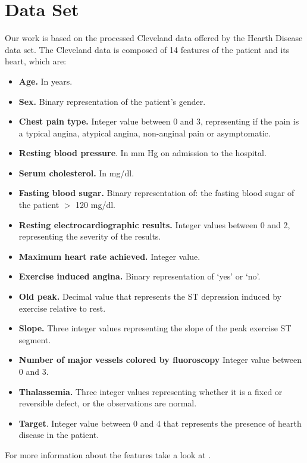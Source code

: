 \section{Data Set}
Our work is based on the processed Cleveland data offered by the Hearth Disease data set. The Cleveland data is composed of 14 features of the patient and its heart, which are:
\begin{itemize}
    \item \textbf{Age.} In years.
    \item \textbf{Sex.} Binary representation of the patient's gender.
    \item \textbf{Chest pain type.} Integer value between 0 and 3, representing if the pain is a typical angina, atypical angina, non-anginal pain or asymptomatic.
    \item \textbf{Resting blood pressure}. In mm Hg on admission to the hospital.
    \item \textbf{Serum cholesterol.} In mg/dl.
    \item \textbf{Fasting blood sugar.} Binary representation of: the fasting blood sugar of the patient $>$ 120 mg/dl.
    \item \textbf{Resting electrocardiographic results.} Integer values between 0 and 2, representing the severity of the results.
    \item \textbf{Maximum heart rate achieved.} Integer value.
    \item \textbf{Exercise induced angina.} Binary representation of `yes' or `no'.
    \item \textbf{Old peak.} Decimal value that represents the ST depression induced by exercise relative to rest.
    \item \textbf{Slope.} Three integer values representing the slope of the peak exercise ST segment.
    \item \textbf{Number of major vessels colored by fluoroscopy} Integer value between 0 and 3.
    \item \textbf{Thalassemia.} Three integer values representing whether it is a fixed or reversible defect, or the observations are normal.
    \item \textbf{Target}. Integer value between 0 and 4 that represents the presence of hearth disease in the patient.
\end{itemize}
For more information about the features take a look at \cite{dataset}.